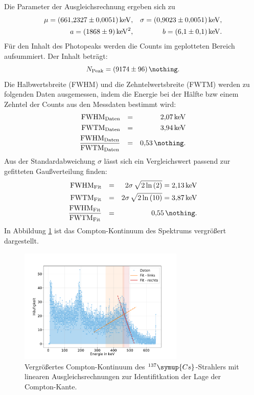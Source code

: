 Die Parameter der Ausgleichsrechnung ergeben sich zu
\begin{align*}
	\mu = \SI{661.2327 (51)}{\kilo \electronvolt}, 	&& \sigma = \SI{0.9023 (51)}{\kilo \electronvolt}, \\
	 a = \SI{1868 (9)}{\kilo \electronvolt^2}, 		&& b = \SI{6.1 (1)}{\kilo \electronvolt}.
\end{align*}
Für den Inhalt des Photopeaks werden die Counts im geplotteten Bereich aufsummiert.
Der Inhalt beträgt:
\begin{equation*}
	N_{\text{Peak}} = \SI{9174 (96)}{\nothing}.
\end{equation*}
Die Halbwertsbreite (FWHM) und die Zehntelwertsbreite (FWTM) werden zu folgenden Daten ausgemessen, indem die Energie bei der Hälfte bzw einem Zehntel der Counts aus den Messdaten bestimmt wird:
\begin{align*}
	\text{FWHM}_{\text{Daten}} && = && \SI{2.07}{\kilo \electronvolt}\\
	\text{FWTM}_{\text{Daten}} && = && \SI{3.94}{\kilo \electronvolt}\\
	\frac{ \text{FWHM}_{\text{Daten}} }{ \text{FWTM}_{\text{Daten}} } && = && \SI{0.53}{\nothing}. \\
\end{align*}
Aus der Standardabweichung $\sigma$ lässt sich ein Vergleichswert passend zur gefitteten Gaußverteilung finden:
\begin{align*}
	\text{FWHM}_{\text{Fit}} && = && 2 \sigma \, \sqrt{2 \ln{(2)}}    = \SI{2.13}{\kilo \electronvolt}\\
	\text{FWTM}_{\text{Fit}} && = && 2 \sigma \, \sqrt{2 \ln{(10)}}  = \SI{3.87}{\kilo \electronvolt}\\
	\frac{ \text{FWHM}_{\text{Fit}} }{ \text{FWTM}_{\text{Fit}} } && = && \SI{0.55}{\nothing}. \\
\end{align*}
In Abbildung \ref{fig:cs_kontinuum} ist das Compton-Kontinuum des Spektrums vergrößert dargestellt.
\begin{figure}[h!]
  \centering
  \includegraphics[width=0.7\textwidth]{content/images/caesium_kontinuum.pdf}
  \caption{Vergrößertes Compton-Kontinuum des $^{137}\symup{Cs}$-Strahlers mit linearen Ausgleichsrechnungen zur Identifitkation der Lage der Compton-Kante.}
  \label{fig:cs_kontinuum}
\end{figure}
